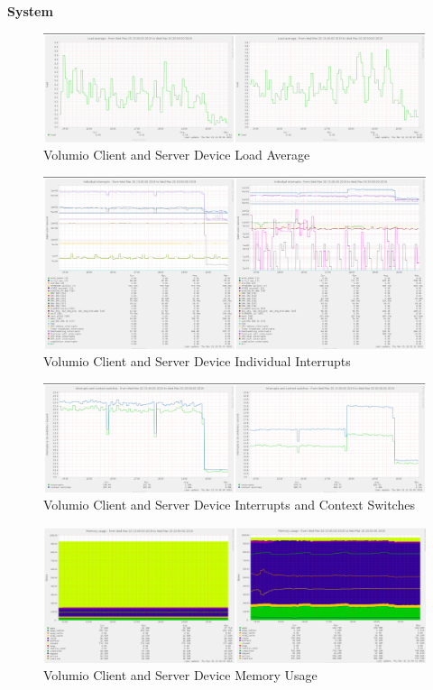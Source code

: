 \documentclass[11pt,a4paper]{scrreprt}
\begin{document}
\textbf{System}

\begin{figure}[H]
\includegraphics{ResultsAndAnalysis/VolumioServerTestImages/016VolumioLoadAverage.png}
\centering
\caption{Volumio Client and Server Device Load Average}
\label{VolumioLoadAvg}
\end{figure}

\begin{figure}[H]
\includegraphics{ResultsAndAnalysis/VolumioServerTestImages/014VolumioIndividualInterrupts.png}
\centering
\caption{Volumio Client and Server Device Individual Interrupts}
\label{VolumioIndInt}
\end{figure}

\begin{figure}[H]
\includegraphics{ResultsAndAnalysis/VolumioServerTestImages/015VolumioInterruptsAndContextSwitches.png}
\centering
\caption{Volumio Client and Server Device Interrupts and Context Switches}
\label{VolumioIntCont}
\end{figure}

\begin{figure}[H]
\includegraphics{ResultsAndAnalysis/VolumioServerTestImages/017VolumioMemoryUsage.png}
\centering
\caption{Volumio Client and Server Device Memory Usage}
\label{VolumioMemUse}
\end{figure}
\end{document}
